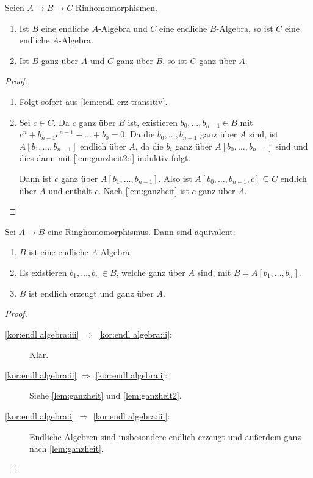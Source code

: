 \documentclass[12pt,a4paper]{scrartcl}
\theoremstyle{cplain}
\theoremstyle{cdef}
\begin{document}
\begin{lem} \label{lem:ganzheit2}
	Seien $A\to B\to C$ Rinhomomorphismen.
	\begin{enumerate}
		\item Ist $B$ eine endliche $A$-Algebra und $C$ eine endliche $B$-Algebra, so ist $C$ eine endliche $A$-Algebra. \label{lem:ganzheit2:i}
		\item Ist $B$ ganz über $A$ und $C$ ganz über $B$, so ist $C$ ganz über $A$. \label{lem:ganzheit2:ii}
	\end{enumerate}	
\end{lem}
\begin{proof}
	\leavevmode
	\begin{enumerate}[label=\ref{lem:ganzheit2:\roman*}]
		\item Folgt sofort aus \cref{lem:endl erz transitiv}.
		\item Sei $c\in C$. Da $c$ ganz über $B$ ist, existieren $b_0, \dots, b_{n-1}\in B$ mit $c^n+b_{n-1}c^{n-1}+\dots +b_0 = 0$. Da die $b_0, \dots, b_{n-1}$ ganz über $A$ sind, ist $A[b_1,\dots, b_{n-1}]$ endlich über $A$, da die $b_i$ ganz über $A[b_0,\ldots,b_{n-1}]$ sind und dies dann mit \ref{lem:ganzheit2:i} induktiv folgt.
		
		Dann ist $c$ ganz über $A[b_1,\dots, b_{n-1}]$. Also ist $A[b_0,\dots, b_{n-1}, c]\subseteq C$ endlich über $A$ und enthält $c$. Nach \cref{lem:ganzheit} ist $c$ ganz über $A$.
		\qedhere
	\end{enumerate}
\end{proof}

\begin{kor} \label{kor:endl algebra}
	Sei $A\to B$ eine Ringhomomorphismus. Dann sind äquivalent:
	\begin{enumerate}
		\item $B$ ist eine endliche $A$-Algebra. \label{kor:endl algebra:i}
		\item Es existieren $b_1,\dots, b_n\in B$, welche ganz über $A$ sind, mit $B = A[b_1,\dots, b_n]$. \label{kor:endl algebra:ii}
		\item $B$ ist endlich erzeugt und ganz über $A$. \label{kor:endl algebra:iii}
	\end{enumerate}
\end{kor}
\begin{proof}
	\leavevmode
	\begin{description}
		\item[\ref{kor:endl algebra:iii} $\Rightarrow$ \ref{kor:endl algebra:ii}:] Klar.
		\item[\ref{kor:endl algebra:ii} $\Rightarrow$ \ref{kor:endl algebra:i}:] Siehe \cref{lem:ganzheit} und \cref{lem:ganzheit2}.
		\item[\ref{kor:endl algebra:i} $\Rightarrow$ \ref{kor:endl algebra:iii}:] Endliche Algebren sind insbesondere endlich erzeugt und außerdem ganz nach \cref{lem:ganzheit}.
		\qedhere
	\end{description}
\end{proof}
\end{document}
